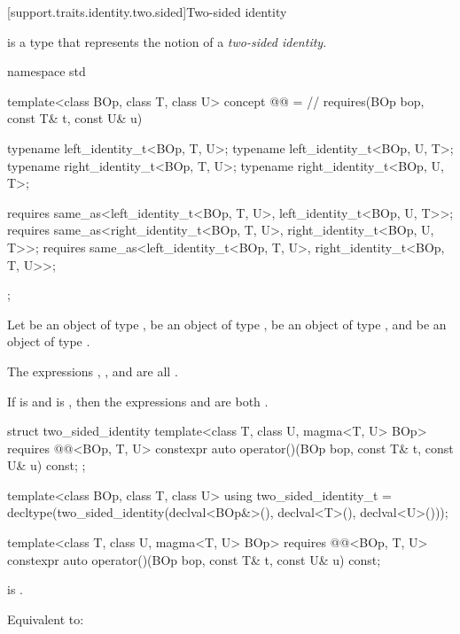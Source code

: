 [support.traits.identity.two.sided]{Two-sided identity}

\pnum
{} is a type that represents the notion of a \textit{two-sided identity}.

\begin{itemdecl}
namespace std {
  template<class BOp, class T, class U>
  concept @@ = // \expos
    requires(BOp bop, const T& t, const U& u) {
       typename left_identity_t<BOp, T, U>;
       typename left_identity_t<BOp, U, T>;
       typename right_identity_t<BOp, T, U>;
       typename right_identity_t<BOp, U, T>;

       requires same_as<left_identity_t<BOp, T, U>, left_identity_t<BOp, U, T>>;
       requires same_as<right_identity_t<BOp, T, U>, right_identity_t<BOp, U, T>>;
       requires same_as<left_identity_t<BOp, T, U>, right_identity_t<BOp, T, U>>;
    };
}
\end{itemdecl}
\begin{itemdescr}
   \pnum
   Let  be an object of type ,  be an
   object of type ,  be an object of type
   , and  be an object of type
   .

   \pnum
   The expressions , , and
    are all .

   \pnum
   If  is  and  is
   , then the expressions  and
    are both .
\end{itemdescr}

\begin{itemdecl}
  struct two_sided_identity {
     template<class T, class U, magma<T, U> BOp>
     requires @@<BOp, T, U>
     constexpr auto operator()(BOp bop, const T& t, const U& u) const;
  };

  template<class BOp, class T, class U>
  using two_sided_identity_t =
    decltype(two_sided_identity{}(declval<BOp&>(), declval<T>(), declval<U>()));
\end{itemdecl}

\begin{itemdecl}
template<class T, class U, magma<T, U> BOp>
requires @@<BOp, T, U>
constexpr auto operator()(BOp bop, const T& t, const U& u) const;
\end{itemdecl}
\begin{itemdescr}
   \pnum
   \expects {} is .

   \pnum
   \effects Equivalent to:
   \begin{codeblock}
      return static_cast<std::common_type_t<T, U>>(left_identity{bop, t, u}());}
   \end{codeblock}
\end{itemdescr}

